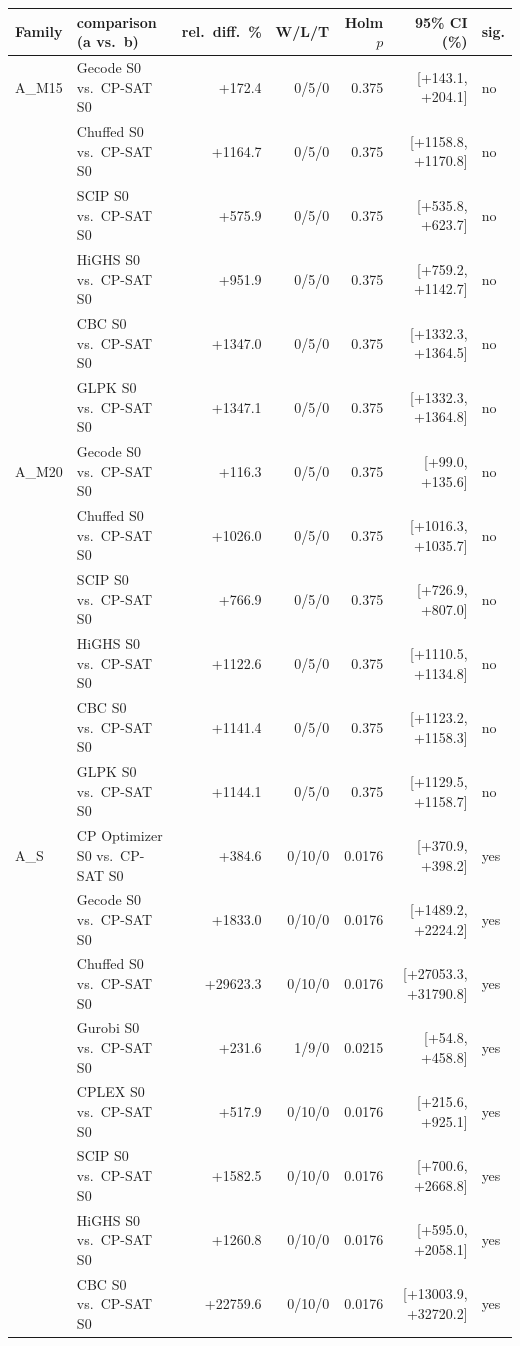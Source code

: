 \begin{longtable}{llrrrrl}
\toprule
Family & comparison (a vs.\ b) & rel.\ diff.\ \% & W/L/T & Holm $p$ & 95\% CI (\%) & sig. \\
\midrule
\endhead
A\_M15 & Gecode S0 vs.\ CP-SAT S0 & +172.4 & 0/5/0 & 0.375 & [+143.1, +204.1] & no \\
 & Chuffed S0 vs.\ CP-SAT S0 & +1164.7 & 0/5/0 & 0.375 & [+1158.8, +1170.8] & no \\
 & SCIP S0 vs.\ CP-SAT S0 & +575.9 & 0/5/0 & 0.375 & [+535.8, +623.7] & no \\
 & HiGHS S0 vs.\ CP-SAT S0 & +951.9 & 0/5/0 & 0.375 & [+759.2, +1142.7] & no \\
 & CBC S0 vs.\ CP-SAT S0 & +1347.0 & 0/5/0 & 0.375 & [+1332.3, +1364.5] & no \\
 & GLPK S0 vs.\ CP-SAT S0 & +1347.1 & 0/5/0 & 0.375 & [+1332.3, +1364.8] & no \\
A\_M20 & Gecode S0 vs.\ CP-SAT S0 & +116.3 & 0/5/0 & 0.375 & [+99.0, +135.6] & no \\
 & Chuffed S0 vs.\ CP-SAT S0 & +1026.0 & 0/5/0 & 0.375 & [+1016.3, +1035.7] & no \\
 & SCIP S0 vs.\ CP-SAT S0 & +766.9 & 0/5/0 & 0.375 & [+726.9, +807.0] & no \\
 & HiGHS S0 vs.\ CP-SAT S0 & +1122.6 & 0/5/0 & 0.375 & [+1110.5, +1134.8] & no \\
 & CBC S0 vs.\ CP-SAT S0 & +1141.4 & 0/5/0 & 0.375 & [+1123.2, +1158.3] & no \\
 & GLPK S0 vs.\ CP-SAT S0 & +1144.1 & 0/5/0 & 0.375 & [+1129.5, +1158.7] & no \\
A\_S & CP Optimizer S0 vs.\ CP-SAT S0 & +384.6 & 0/10/0 & 0.0176 & [+370.9, +398.2] & yes \\
 & Gecode S0 vs.\ CP-SAT S0 & +1833.0 & 0/10/0 & 0.0176 & [+1489.2, +2224.2] & yes \\
 & Chuffed S0 vs.\ CP-SAT S0 & +29623.3 & 0/10/0 & 0.0176 & [+27053.3, +31790.8] & yes \\
 & Gurobi S0 vs.\ CP-SAT S0 & +231.6 & 1/9/0 & 0.0215 & [+54.8, +458.8] & yes \\
 & CPLEX S0 vs.\ CP-SAT S0 & +517.9 & 0/10/0 & 0.0176 & [+215.6, +925.1] & yes \\
 & SCIP S0 vs.\ CP-SAT S0 & +1582.5 & 0/10/0 & 0.0176 & [+700.6, +2668.8] & yes \\
 & HiGHS S0 vs.\ CP-SAT S0 & +1260.8 & 0/10/0 & 0.0176 & [+595.0, +2058.1] & yes \\
 & CBC S0 vs.\ CP-SAT S0 & +22759.6 & 0/10/0 & 0.0176 & [+13003.9, +32720.2] & yes \\

\end{longtable}
